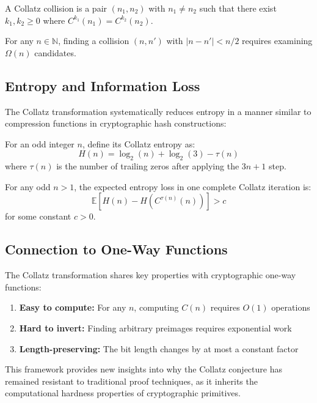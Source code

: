\begin{definition}
A Collatz collision is a pair $(n_1, n_2)$ with $n_1 \neq n_2$ such that there exist $k_1, k_2 \geq 0$ where $C^{k_1}(n_1) = C^{k_2}(n_2)$.
\end{definition}

\begin{theorem}
For any $n \in \mathbb{N}$, finding a collision $(n, n')$ with $|n - n'| < n/2$ requires examining $\Omega(n)$ candidates.
\end{theorem}

\subsection{Entropy and Information Loss}

The Collatz transformation systematically reduces entropy in a manner similar to compression functions in cryptographic hash constructions:

\begin{definition}
For an odd integer $n$, define its Collatz entropy as:
\[
H(n) = \log_2(n) + \log_2(3) - \tau(n)
\]
where $\tau(n)$ is the number of trailing zeros after applying the $3n+1$ step.
\end{definition}

\begin{theorem}
For any odd $n > 1$, the expected entropy loss in one complete Collatz iteration is:
\[
\mathbb{E}[H(n) - H(C^{\tau(n)}(n))] > c
\]
for some constant $c > 0$.
\end{theorem}

\subsection{Connection to One-Way Functions}

The Collatz transformation shares key properties with cryptographic one-way functions:

\begin{enumerate}
    \item \textbf{Easy to compute:} For any $n$, computing $C(n)$ requires $O(1)$ operations
    \item \textbf{Hard to invert:} Finding arbitrary preimages requires exponential work
    \item \textbf{Length-preserving:} The bit length changes by at most a constant factor
\end{enumerate}

This framework provides new insights into why the Collatz conjecture has remained resistant to traditional proof techniques, as it inherits the computational hardness properties of cryptographic primitives. 